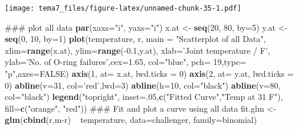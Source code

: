 \documentclass[]{article}
\newenvironment{Shaded}{\begin{snugshade}}{\end{snugshade}}
\newcommand{\KeywordTok}[1]{\textcolor[rgb]{0.13,0.29,0.53}{\textbf{{#1}}}}
\newcommand{\DataTypeTok}[1]{\textcolor[rgb]{0.13,0.29,0.53}{{#1}}}
\newcommand{\DecValTok}[1]{\textcolor[rgb]{0.00,0.00,0.81}{{#1}}}
\newcommand{\FloatTok}[1]{\textcolor[rgb]{0.00,0.00,0.81}{{#1}}}
\newcommand{\StringTok}[1]{\textcolor[rgb]{0.31,0.60,0.02}{{#1}}}
\newcommand{\OtherTok}[1]{\textcolor[rgb]{0.56,0.35,0.01}{{#1}}}
\newcommand{\NormalTok}[1]{{#1}}
\numberwithin{equation}{section}
\begin{document}
\texttt{[image: tema7\_files/figure-latex/unnamed-chunk-35-1.pdf]}

\begin{Shaded}
\begin{Highlighting}[]
\NormalTok{### plot all data}
\KeywordTok{par}\NormalTok{(}\DataTypeTok{xaxs=}\StringTok{"i"}\NormalTok{, }\DataTypeTok{yaxs=}\StringTok{"i"}\NormalTok{)}
\NormalTok{x.at <-}\StringTok{ }\KeywordTok{seq}\NormalTok{(}\DecValTok{20}\NormalTok{, }\DecValTok{80}\NormalTok{, }\DataTypeTok{by=}\DecValTok{5}\NormalTok{)}
\NormalTok{y.at <-}\StringTok{ }\KeywordTok{seq}\NormalTok{(}\DecValTok{0}\NormalTok{, }\DecValTok{10}\NormalTok{, }\DataTypeTok{by=}\DecValTok{1}\NormalTok{)}
\KeywordTok{plot}\NormalTok{(temperature, r, }\DataTypeTok{main =} \StringTok{"Scatterplot of all Data"}\NormalTok{, }\DataTypeTok{xlim=}\KeywordTok{range}\NormalTok{(x.at),}
     \DataTypeTok{ylim=}\KeywordTok{range}\NormalTok{(-}\FloatTok{0.1}\NormalTok{,y.at), }\DataTypeTok{xlab=}\StringTok{'Joint temperature / F'}\NormalTok{, }
     \DataTypeTok{ylab=}\StringTok{'No. of O-ring failures'}\NormalTok{,}\DataTypeTok{cex=}\FloatTok{1.65}\NormalTok{, }\DataTypeTok{col=}\StringTok{"blue"}\NormalTok{,}
     \DataTypeTok{pch=} \DecValTok{19}\NormalTok{,}\DataTypeTok{type=} \StringTok{"p"}\NormalTok{,}\DataTypeTok{axes=}\OtherTok{FALSE}\NormalTok{)}
\KeywordTok{axis}\NormalTok{(}\DecValTok{1}\NormalTok{, }\DataTypeTok{at=} \NormalTok{x.at, }\DataTypeTok{lwd.ticks =} \DecValTok{0}\NormalTok{)}
\KeywordTok{axis}\NormalTok{(}\DecValTok{2}\NormalTok{, }\DataTypeTok{at=} \NormalTok{y.at, }\DataTypeTok{lwd.ticks =} \DecValTok{0}\NormalTok{)}
\KeywordTok{abline}\NormalTok{(}\DataTypeTok{v=}\DecValTok{31}\NormalTok{, }\DataTypeTok{col=}\StringTok{'red'}\NormalTok{,}\DataTypeTok{lwd=}\DecValTok{3}\NormalTok{)}
\KeywordTok{abline}\NormalTok{(}\DataTypeTok{h=}\DecValTok{10}\NormalTok{, }\DataTypeTok{col=}\StringTok{"black"}\NormalTok{)}
\KeywordTok{abline}\NormalTok{(}\DataTypeTok{v=}\DecValTok{80}\NormalTok{, }\DataTypeTok{col=}\StringTok{"black"}\NormalTok{)}
\KeywordTok{legend}\NormalTok{(}\StringTok{"topright"}\NormalTok{, }\DataTypeTok{inset=}\NormalTok{.}\DecValTok{05}\NormalTok{,}\KeywordTok{c}\NormalTok{(}\StringTok{"Fitted Curve"}\NormalTok{,}\StringTok{"Temp at 31 F"}\NormalTok{),}
       \DataTypeTok{fill=}\KeywordTok{c}\NormalTok{(}\StringTok{"orange"}\NormalTok{, }\StringTok{"red"}\NormalTok{))}
\NormalTok{### Fit and plot a curve using all data}
\NormalTok{fit.glm <-}\StringTok{ }\KeywordTok{glm}\NormalTok{(}\KeywordTok{cbind}\NormalTok{(r,m-r) ~}\StringTok{ }\NormalTok{temperature, }\DataTypeTok{data=}\NormalTok{challenger, }\DataTypeTok{family=}\NormalTok{binomial)}

\end{Highlighting}
\end{Shaded}
\end{document}
